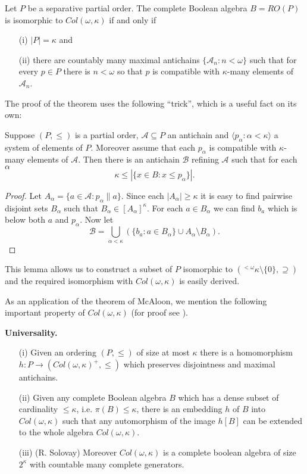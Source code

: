 \begin{theorem}[McAloon]\label{macaloon} Let $P$ be a separative partial order. The complete Boolean algebra $B=RO(P)$ is isomorphic to $Col(\omega,\kappa)$
if and only if
\begin{itemize}
 \item[(i)] $|P|=\kappa$ and
 \item[(ii)] there are countably many maximal antichains $\{\mathcal{A}_n:n<\omega\}$ such that for
 every $p\in P$ there is $n<\omega$ so that $p$ is compatible with $\kappa$-many elements of $\mathcal{A}_n$.
\end{itemize}
\end{theorem}

The proof of the theorem uses the following ``trick'', which is a useful fact on its own:

\begin{lemma}
Suppose $(P,\leq)$ is a partial order, ${\mathcal A}\subseteq P$ an antichain and
$\langle p_\alpha:\alpha<\kappa\rangle$ a system of elements of $P$. Moreover assume that
each $p_\alpha$ is compatible with $\kappa$-many elements of ${\mathcal A}$. Then
there is an antichain ${\mathcal B}$ refining ${\mathcal A}$ such that for each $\alpha$
$$
\kappa\leq|\{ x\in B:x\leq p_\alpha\}|.
$$
\end{lemma}
\begin{proof} Let $A_\alpha=\{a\in{\mathcal A}:p_\alpha\parallel a\}$. Since each $|A_\alpha|\geq\kappa$
it is easy to find pairwise disjoint sets $B_\alpha$ such that $B_\alpha\in [A_\alpha]^\kappa$. For
each $a\in B_\alpha$ we can find $b_a$ which is below both $a$ and $p_\alpha$. Now let
$$
\mathcal{B}=\bigcup_{\alpha<\kappa}\left(\{b_a:a\in B_\alpha\}\cup A_\alpha\setminus B_\alpha\right).
$$
\end{proof}

This lemma allows us to construct a subset of $P$ isomorphic to $({}^{<\omega}\kappa\setminus\{0\},\supseteq)$
and the required isomorphism with $Col(\omega,\kappa)$ is easily derived.

As an application of the theorem of McAloon, we mention the following important property of $Col(\omega,\kappa)$ (for proof see \cite{RSHBA}).

\begin{theorem}[Kripke]{\bf Universality.}
\begin{itemize}
 \item[(i)]Given an ordering $(P,\leq)$ of size at most $\kappa$ there is a homomorphism $h:P\to (Col(\omega,\kappa)^+,\leq)$
 which preserves disjointness and maximal antichains.
 \item[(ii)] Given any complete Boolean algebra $B$ which has a dense subset of cardinality $\leq\kappa$, i.e. $\pi(B)\leq\kappa$,
 there is an embedding $h$ of $B$ into $Col(\omega,\kappa)$ such that any automorphism of the image $h[B]$ can be extended to the
 whole algebra $Col(\omega,\kappa)$.
 \item[(iii)] (R. Solovay) Moreover $Col(\omega,\kappa)$ is a complete boolean algebra of size $2^\kappa$ with countable many complete generators.
\end{itemize}
\end{theorem}



